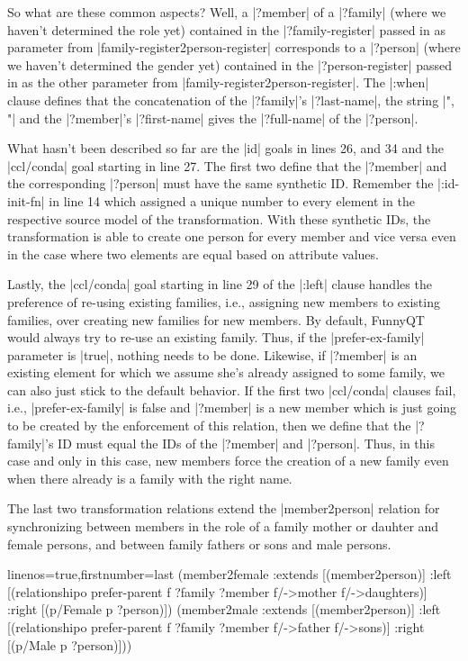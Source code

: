 \documentclass[a4paper]{article}
\newcommand{\code}{\clojureinline}
\begin{document}
So what are these common aspects?  Well, a \code|?member| of a \code|?family|
(where we haven't determined the role yet) contained in the
\code|?family-register| passed in as parameter from
\code|family-register2person-register| corresponds to a \code|?person| (where
we haven't determined the gender yet) contained in the \code|?person-register|
passed in as the other parameter from \code|family-register2person-register|.
The \code|:when| clause defines that the concatenation of the \code|?family|'s
\code|?last-name|, the string \code|", "| and the \code|?member|'s
\code|?first-name| gives the \code|?full-name| of the \code|?person|.

What hasn't been described so far are the \code|id| goals in lines 26, and 34
and the \code|ccl/conda| goal starting in line 27.  The first two define that
the \code|?member| and the corresponding \code|?person| must have the same
synthetic ID.  Remember the \code|:id-init-fn| in line 14 which assigned a
unique number to every element in the respective source model of the
transformation.  With these synthetic IDs, the transformation is able to create
one person for every member and vice versa even in the case where two elements
are equal based on attribute values.

Lastly, the \code|ccl/conda| goal starting in line 29 of the \code|:left|
clause handles the preference of re-using existing families, i.e., assigning
new members to existing families, over creating new families for new members.
By default, FunnyQT would always try to re-use an existing family.  Thus, if
the \code|prefer-ex-family| parameter is \code|true|, nothing needs to be done.
Likewise, if \code|?member| is an existing element for which we assume she's
already assigned to some family, we can also just stick to the default
behavior.  If the first two \code|ccl/conda| clauses fail, i.e.,
\code|prefer-ex-family| is false and \code|?member| is a new member which is
just going to be created by the enforcement of this relation, then we define
that the \code|?family|'s ID must equal the IDs of the \code|?member| and
\code|?person|.  Thus, in this case and only in this case, new members force
the creation of a new family even when there already is a family with the right
name.

The last two transformation relations extend the \code|member2person| relation
for synchronizing between members in the role of a family mother or dauhter and
female persons, and between family fathers or sons and male persons.

\begin{clojurecode*}{linenos=true,firstnumber=last}
  (member2female
   :extends [(member2person)]
   :left  [(relationshipo prefer-parent f ?family ?member f/->mother f/->daughters)]
   :right [(p/Female p ?person)])
  (member2male
   :extends [(member2person)]
   :left  [(relationshipo prefer-parent f ?family ?member f/->father f/->sons)]
   :right [(p/Male p ?person)]))
\end{clojurecode*}
\end{document}
